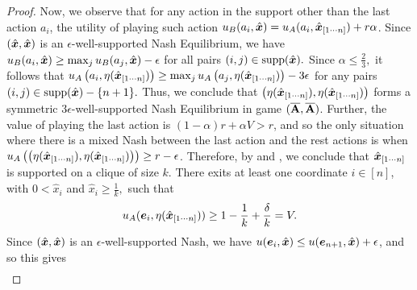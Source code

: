 \begin{proof}
     Now, we observe that for any action in the support other than the last action $a_i$, the utility of playing such action $u_B(a_i, \hat{{\bm{x}}}) = u_A(a_i, \hat{{\bm{x}}}_{[1 \cdots n]}) + r \alpha$. Since $(\hat{{\bm{x}}}, \hat{{\bm{x}}})$ is an $\epsilon$-well-supported Nash Equilibrium, we have $u_B(a_i, \hat{{\bm{x}}}) \geq \max_{j} u_B(a_j, \hat{{\bm{x}}}) - \epsilon$ for all pairs $(i, j) \in \text{supp}(\hat{{\bm{x}}}).$ Since $\alpha \leq \frac{2}{3},$ it follows that $u_A\left(a_i, \eta(\hat{{\bm{x}}}_{[1 \cdots n]})\right) \geq \max_j u_A\left(a_j, \eta(\hat{{\bm{x}}}_{[1 \cdots n]})\right) - 3\epsilon$ for any pairs $(i, j) \in \text{supp}(\hat{{\bm{x}}}) - \{n + 1\}.$ Thus, we conclude that $\left(\eta(\hat{{\bm{x}}}_{[1 \cdots n]}), \eta(\hat{{\bm{x}}}_{[1 \cdots n]})\right)$ forms a symmetric $3\epsilon$-well-supported Nash Equilibrium in game $(\overline{\mathbf{A}}, \overline{\mathbf{A}})$. Further, the value of playing the last action is $(1 - \alpha)r + \alpha V > r$, and so the only situation where there is a mixed Nash between the last action and the rest actions is when $u_A\left(\left(\eta(\hat{{\bm{x}}}_{[1\cdots n]}), \eta(\hat{{\bm{x}}}_{[1\cdots n]})\right)\right) \geq r - \epsilon$. Therefore, by  and , we conclude that $\hat{{\bm{x}}}_{[1 \cdots n]}$ is supported on a clique of size $k.$
     There exits at least one coordinate $i \in [n]$, with $0 < \hat{x}_i$ and $ \hat{x}_i \geq \frac{1}{k},$ such that
    \begin{align*}
        u_A({\bm{e}}_{i}, \eta(\hat{{\bm{x}}}_{[1 \cdots n]})) \geq 1 - \frac{1}{k} + \frac{\delta}{k} = V.
    \end{align*}
    Since $(\hat{{\bm{x}}}, \hat{{\bm{x}}})$ is an $\epsilon$-well-supported Nash, we have $u({\bm{e}}_i, \hat{{\bm{x}}}) \leq u({\bm{e}}_{n +1}, 
    \hat{{\bm{x}}}) + \epsilon$, and so this gives
    \begin{align}

\end{align}
\end{proof}
